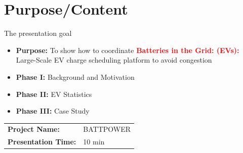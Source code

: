 \documentclass{beamer}
\begin{document}
\section{Purpose/Content}
\begin{frame}{The presentation goal}
\begin{itemize}
\item \textbf{Purpose:} To show how to coordinate \textcolor{red}{\textbf{Batteries in the Grid: (EVs):}} Large-Scale EV charge scheduling platform to avoid congestion 
\item \textbf{Phase I:} Background and Motivation
\item \textbf{Phase II:} EV Statistics
\item \textbf{Phase III:} Case Study
\end{itemize}
\begin{center}
\begin{tabular}{|l l|} 
\hline
\rowcolor{Gray} \textbf{Project Name:} &BATTPOWER \\
\textbf{Presentation Time:}& 10 min \\
\hline
\end{tabular}
\end{center}
\end{frame}

\begin{frame}[plain]

\end{frame}
\end{document}

